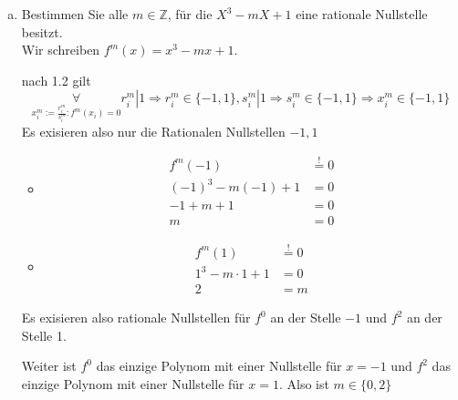 \documentclass{article}
\newcommand{\Z}{\mathbb{Z}}
\begin{document}
\begin{enumerate}[(a)]
        Es ist aber
        $f(-1)=-6,f(1)=0$
        also ist $x_i=\{1\}$
    \item
        \color{blue}
        Bestimmen Sie alle $m\in\Z$, für die $X^3-mX+1$ eine
        rationale Nullstelle besitzt.\\
        \color{black}
        Wir schreiben $f^m(x)=x^3-mx+1$.

        nach 1.2 gilt
        \begin{equation*}
            \underset{x_i^m:=\frac{r_i^m}{s_i^m}:f^m(x_i)=0}
            \forall
            r_i^m|1\Rightarrow r_i^m\in\{-1,1\},
            s_i^m|1\Rightarrow s_i^m\in\{-1,1\}
            \Rightarrow x_i^m\in\{-1,1\}
        \end{equation*}
        Es exisieren also nur die Rationalen
        Nullstellen $-1, 1$
        \begin{itemize}
            \item
                \begin{align*}
                    f^m(-1)&\overset{!}=0\\
                    (-1)^3-m(-1)+1&=0\\
                    -1+m+1&=0\\
                    m&=0
                \end{align*}
            \item
                \begin{align*}
                    f^m(1)&\overset{!}=0\\
                    1^3-m\cdot 1+1&=0\\
                    2&=m
                \end{align*}
        \end{itemize}
        Es exisieren also rationale Nullstellen für
        $f^{0}$ an der Stelle $-1$ und $f^2$ an der Stelle 1.

        Weiter ist $f^0$ das einzige Polynom mit einer
        Nullstelle für $x=-1$ und $f^2$ das einzige Polynom
        mit einer Nullstelle für $x=1$.
        Also ist $m\in\{0,2\}$
\end{enumerate}
\end{document}
